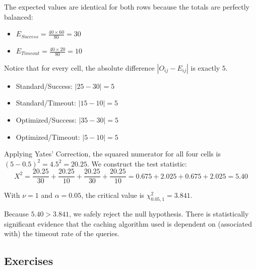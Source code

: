 \documentclass{article}
\begin{document}
The expected values are identical for both rows because the totals are perfectly balanced:
\begin{itemize}
    \item $E_{Success} = \frac{40 \times 60}{80} = 30$
    \item $E_{Timeout} = \frac{40 \times 20}{80} = 10$
\end{itemize}

Notice that for every cell, the absolute difference $|O_{ij} - E_{ij}|$ is exactly $5$. 
\begin{itemize}
    \item Standard/Success: $|25 - 30| = 5$
    \item Standard/Timeout: $|15 - 10| = 5$
    \item Optimized/Success: $|35 - 30| = 5$
    \item Optimized/Timeout: $|5 - 10| = 5$
\end{itemize}

Applying Yates' Correction, the squared numerator for all four cells is $(5 - 0.5)^2 = 4.5^2 = 20.25$. We construct the test statistic:
$$ X^2 = \frac{20.25}{30} + \frac{20.25}{10} + \frac{20.25}{30} + \frac{20.25}{10} = 0.675 + 2.025 + 0.675 + 2.025 = 5.40 $$

With $\nu = 1$ and $\alpha = 0.05$, the critical value is $\chi^2_{0.05, 1} = 3.841$. 

Because $5.40 > 3.841$, we safely reject the null hypothesis. There is statistically significant evidence that the caching algorithm used is dependent on (associated with) the timeout rate of the queries.

\subsection{Exercises}
\end{document}
